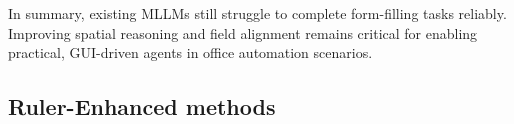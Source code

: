 \documentclass[sigconf, screen, review]{acmart}
\newcommand{\bobo}[1]{%
  \begin{CJK}{UTF8}{gbsn} %
  {\color{cyan}Bobo: #1}%
  \end{CJK}%
}
\begin{document}
In summary, existing MLLMs still struggle to complete form-filling tasks reliably. Improving spatial reasoning and field alignment remains critical for enabling practical, GUI-driven agents in office automation scenarios.
\subsection{Ruler-Enhanced methods}


\end{document}
